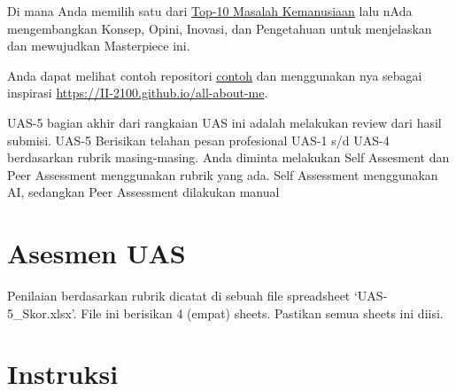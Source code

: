 \documentclass[
  letterpaper,
  DIV=11,
  numbers=noendperiod]{scrreprt}
\begin{document}
Di mana Anda memilih satu dari \href{../bahan/top10.pdf}{Top-10 Masalah
Kemanusiaan} lalu nAda mengembangkan Konsep, Opini, Inovasi, dan
Pengetahuan untuk menjelaskan dan mewujudkan Masterpiece ini.

Anda dapat melihat contoh repositori
\href{https://github.com/II-2100/all-about-me}{contoh} dan menggunakan
nya sebagai inspirasi \url{https://II-2100.github.io/all-about-me}.

UAS-5 bagian akhir dari rangkaian UAS ini adalah melakukan review dari
hasil submisi. UAS-5 Berisikan telahan pesan profesional UAS-1 s/d UAS-4
berdasarkan rubrik masing-masing. Anda diminta melakukan Self Assesment
dan Peer Assessment menggunakan rubrik yang ada. Self Assessment
menggunakan AI, sedangkan Peer Assessment dilakukan manual

\section*{Asesmen UAS}\label{asesmen-uas-1}


\begin{tcolorbox}[enhanced jigsaw, breakable, rightrule=.15mm, colbacktitle=quarto-callout-important-color!10!white, opacityback=0, titlerule=0mm, leftrule=.75mm, bottomrule=.15mm, toptitle=1mm, colframe=quarto-callout-important-color-frame, bottomtitle=1mm, arc=.35mm, coltitle=black, opacitybacktitle=0.6, toprule=.15mm, left=2mm, title=\textcolor{quarto-callout-important-color}{\faExclamation}\hspace{0.5em}{Important}, colback=white]

Penilaian berdasarkan rubrik dicatat di sebuah file spreadsheet
`UAS-5\_Skor.xlsx'. File ini berisikan 4 (empat) sheets. Pastikan semua
sheets ini diisi.

\end{tcolorbox}

\section*{Instruksi}\label{instruksi-3}

\end{document}

